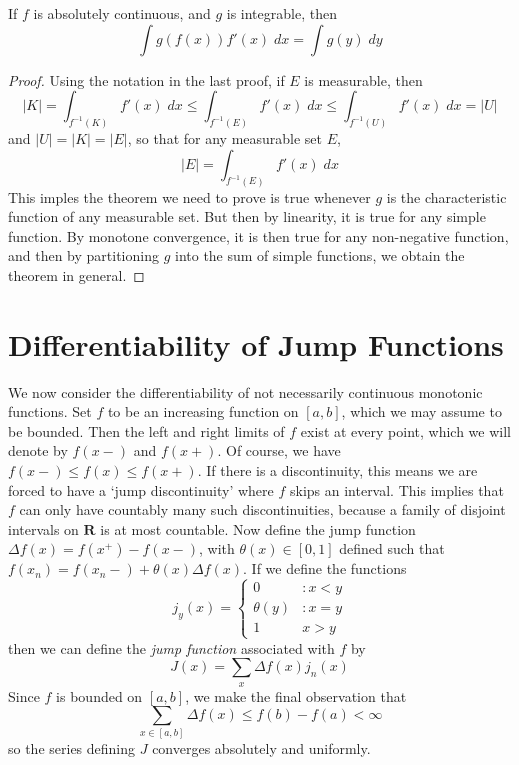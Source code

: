 \begin{theorem}
  If $f$ is absolutely continuous, and $g$ is integrable, then
  \[ \int g(f(x)) f'(x)\; dx = \int g(y)\; dy \]
\end{theorem}
\begin{proof}
  Using the notation in the last proof, if $E$ is measurable, then
  \[ |K| = \int_{f^{-1}(K)} f'(x)\; dx \leq \int_{f^{-1}(E)} f'(x)\; dx \leq \int_{f^{-1}(U)} f'(x)\; dx = |U| \]
  and $|U| = |K| = |E|$, so that for any measurable set $E$,
  \[ |E| = \int_{f^{-1}(E)} f'(x)\; dx \]
  This imples the theorem we need to prove is true whenever $g$ is the characteristic function of any measurable set. But then by linearity, it is true for any simple function. By monotone convergence, it is then true for any non-negative function, and then by partitioning $g$ into the sum of simple functions, we obtain the theorem in general.
\end{proof}





\section{Differentiability of Jump Functions}

We now consider the differentiability of not necessarily continuous monotonic functions. Set $f$ to be an increasing function on $[a,b]$, which we may assume to be bounded.  Then the left and right limits of $f$ exist at every point, which we will denote by $f(x-)$ and $f(x+)$. Of course, we have $f(x-) \leq f(x) \leq f(x+)$. If there is a discontinuity, this means we are forced to have a `jump discontinuity' where $f$ skips an interval. This implies that $f$ can only have countably many such discontinuities, because a family of disjoint intervals on $\mathbf{R}$ is at most countable. Now define the jump function $\Delta f(x) = f(x^+) - f(x-)$, with $\theta(x) \in [0,1]$ defined such that $f(x_n) = f(x_n-) + \theta(x) \Delta f(x)$. If we define the functions
%
\[ j_y(x) = \begin{cases} 0 & : x < y \\ \theta(y) & : x = y \\ 1 & x > y \end{cases} \]
%
then we can define the \emph{jump function} associated with $f$ by
%
\[ J(x) = \sum_x \Delta f(x) j_n(x) \]
%
Since $f$ is bounded on $[a,b]$, we make the final observation that
%
\[ \sum_{x \in [a,b]} \Delta f(x) \leq f(b) - f(a) < \infty \]
%
so the series defining $J$ converges absolutely and uniformly.

